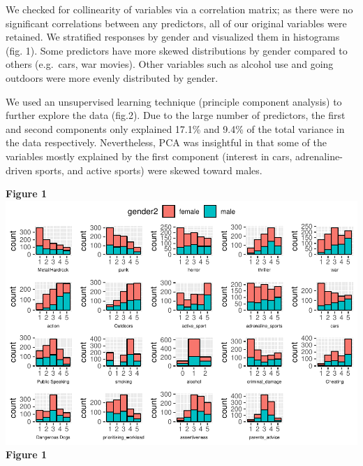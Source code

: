 \documentclass[]{article}
\begin{document}
We checked for collinearity of variables via a correlation matrix; as
there were no significant correlations between any predictors, all of
our original variables were retained. We stratified responses by gender
and visualized them in histograms (fig. 1). Some predictors have more
skewed distributions by gender compared to others (e.g.~cars, war
movies). Other variables such as alcohol use and going outdoors were
more evenly distributed by gender.

We used an unsupervised learning technique (principle component
analysis) to further explore the data (fig.2). Due to the large number
of predictors, the first and second components only explained 17.1\% and
9.4\% of the total variance in the data respectively. Nevertheless, PCA
was insightful in that some of the variables mostly explained by the
first component (interest in cars, adrenaline-driven sports, and active
sports) were skewed toward males.

\textbf{Figure 1}
\includegraphics{final_report_files/figure-latex/unnamed-chunk-1-1.pdf}
\textbf{Figure 1}
\end{document}
